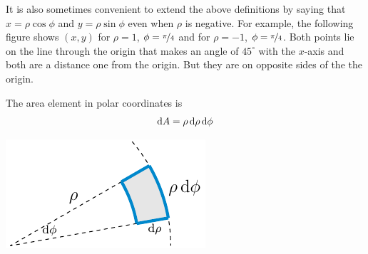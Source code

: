 It is also sometimes convenient to extend the above definitions by saying that
$x=\rho\cos\phi$ and $y=\rho\sin\phi$ even when $\rho$ is negative. For example,
the following figure shows $(x,y)$ for $\rho=1$, $\phi=\nicefrac{\pi}{4}$
and for $\rho=-1$, $\phi=\nicefrac{\pi}{4}$.
Both points lie on the  line through the origin that makes an angle of
$45^\circ$ with the $x$-axis and both are a distance one from the origin.
But they are on opposite sides of the the origin.

The area element in polar coordinates is
\begin{equation*}
\mathrm{d}A = \rho\,\mathrm{d}\rho\,\mathrm{d}\phi
\end{equation*}
\begin{efig}
\begin{center}
    \includegraphics{polarA.pdf}
\end{center}
\end{efig}





